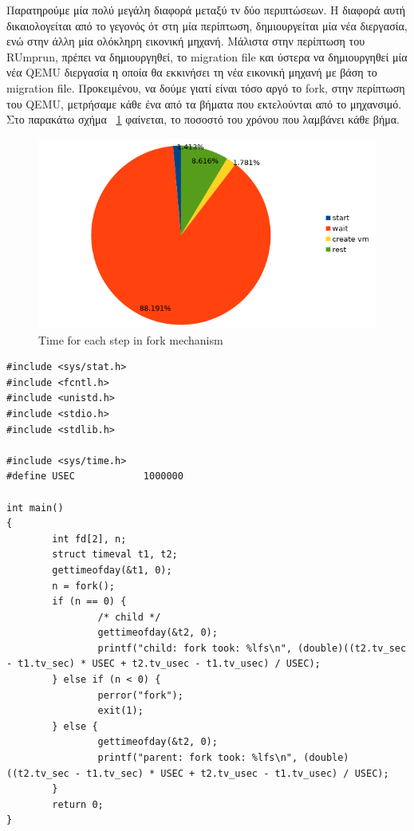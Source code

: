 Παρατηρούμε μία πολύ μεγάλη διαφορά μεταξύ τν δύο περιπτώσεων. Η διαφορά αυτή
δικαιολογείται από το γεγονός ότ στη μία περίπτωση, δημιουργείται μία νέα
διεργασία, ενώ στην άλλη μία ολόκληρη εικονική μηχανή. Μάλιστα στην περίπτωση
του RUmprun, πρέπει να δημιουργηθεί, το migration file και ύστερα να
δημιουργηθεί μία νέα QEMU διεργασία η οποία θα εκκινήσει τη νέα εικονική μηχανή
με βάση το migration file. Προκειμένου, να δούμε γιατί είναι τόσο αργό το fork,
στην περίπτωση του QEMU, μετρήσαμε κάθε ένα από τα βήματα που εκτελούνται από 
το μηχανσιμό. 
Στο παρακάτω σχήμα ~\ref{fig4_12} φαίνεται, το ποσοστό του χρόνου που
λαμβάνει κάθε βήμα.

\begin{figure}[htp]
\centerline{\includegraphics[scale=0.8]{figures/fork_pie.png}}
\caption{Time for each step in fork mechanism\label{fig4_12}}
\end{figure}

\newpage
\begin{lstlisting}
#include <sys/stat.h>
#include <fcntl.h>
#include <unistd.h>
#include <stdio.h>
#include <stdlib.h>

#include <sys/time.h>
#define USEC            1000000

int main()
{
        int fd[2], n;
        struct timeval t1, t2;
        gettimeofday(&t1, 0);
        n = fork();
        if (n == 0) {
                /* child */
                gettimeofday(&t2, 0);
                printf("child: fork took: %lfs\n", (double)((t2.tv_sec - t1.tv_sec) * USEC + t2.tv_usec - t1.tv_usec) / USEC);
        } else if (n < 0) {
                perror("fork");
                exit(1);
        } else {
                gettimeofday(&t2, 0);
                printf("parent: fork took: %lfs\n", (double)((t2.tv_sec - t1.tv_sec) * USEC + t2.tv_usec - t1.tv_usec) / USEC);
        }
        return 0;
}

\end{lstlisting}
